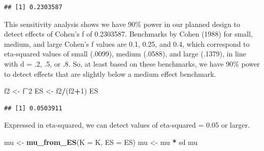 \documentclass[]{book}
\newenvironment{Shaded}{\begin{snugshade}}{\end{snugshade}}
\newcommand{\CommentTok}[1]{\textcolor[rgb]{0.56,0.35,0.01}{\textit{#1}}}
\newcommand{\DataTypeTok}[1]{\textcolor[rgb]{0.13,0.29,0.53}{#1}}
\newcommand{\DecValTok}[1]{\textcolor[rgb]{0.00,0.00,0.81}{#1}}
\newcommand{\FloatTok}[1]{\textcolor[rgb]{0.00,0.00,0.81}{#1}}
\newcommand{\KeywordTok}[1]{\textcolor[rgb]{0.13,0.29,0.53}{\textbf{#1}}}
\newcommand{\NormalTok}[1]{#1}
\newcommand{\OperatorTok}[1]{\textcolor[rgb]{0.81,0.36,0.00}{\textbf{#1}}}
\newcommand{\StringTok}[1]{\textcolor[rgb]{0.31,0.60,0.02}{#1}}
\begin{document}
\begin{Shaded}
\end{Shaded}

\begin{verbatim}
## [1] 0.2303587
\end{verbatim}

This sensitivity analysis shows we have 90\% power in our planned design to detect effects of Cohen's f of 0.2303587. Benchmarks by Cohen (1988) for small, medium, and large Cohen's f values are 0.1, 0.25, and 0.4, which correspond to eta-squared values of small (.0099), medium (.0588), and large (.1379), in line with d = .2, .5, or .8. So, at least based on these benchmarks, we have 90\% power to detect effects that are slightly below a medium effect benchmark.

\begin{Shaded}
\begin{Highlighting}[]
\NormalTok{f2 <-}\StringTok{ }\NormalTok{f}\OperatorTok{^}\DecValTok{2}
\NormalTok{ES <-}\StringTok{ }\NormalTok{f2}\OperatorTok{/}\NormalTok{(f2}\OperatorTok{+}\DecValTok{1}\NormalTok{)}
\NormalTok{ES}
\end{Highlighting}
\end{Shaded}

\begin{verbatim}
## [1] 0.0503911
\end{verbatim}

Expressed in eta-squared, we can detect values of eta-squared = 0.05 or larger.

\begin{Shaded}
\begin{Highlighting}[]
\NormalTok{mu <-}\StringTok{ }\KeywordTok{mu_from_ES}\NormalTok{(}\DataTypeTok{K =}\NormalTok{ K, }\DataTypeTok{ES =}\NormalTok{ ES)}
\NormalTok{mu <-}\StringTok{ }\NormalTok{mu }\OperatorTok{*}\StringTok{ }\NormalTok{sd}
\NormalTok{mu}
\end{Highlighting}
\end{Shaded}
\end{document}
